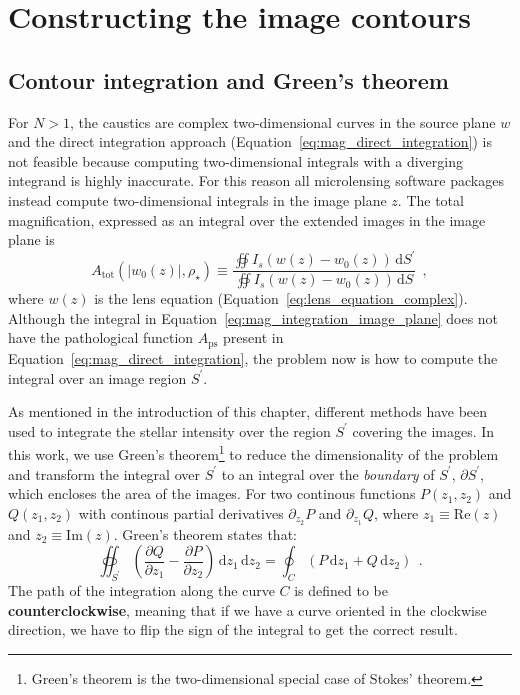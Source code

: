 \documentclass[12pt,dvipsnames]{report}
\newcommand{\ud}{\,\mathrm{d}}
\newcommand{\hquad}{~~}
\begin{document}
\section{Constructing the image contours}
\label{sec:caustics_constructing_contours}
\subsection{Contour integration and Green's theorem}
For $N>1$, the caustics are complex two-dimensional curves in the source plane
$w$ and the direct integration approach (Equation~\ref{eq:mag_direct_integration}) is not 
feasible because computing two-dimensional integrals with a diverging integrand is 
highly inaccurate. For this reason all microlensing software packages instead 
compute two-dimensional integrals in the image plane $z$. The total magnification, 
expressed as an integral over the extended images in the image plane is 
\begin{equation}
    A_\mathrm{tot}(|w_0(z)|,\rho_\star)\equiv \frac{\oiint I_s(w(z) - w_0(z))\ud S^\prime}{
        \oiint I_s(w(z) - w_0(z))\ud S}
        \hquad,
    \label{eq:mag_integration_image_plane}
\end{equation}
where $w(z)$ is the lens equation (Equation~\ref{eq:lens_equation_complex}).
Although the integral in Equation~\ref{eq:mag_integration_image_plane} does not have the
pathological function $A_\mathrm{ps}$ present in Equation~\ref{eq:mag_direct_integration},
the problem now is how to compute the integral over an image region $S^\prime$.

As mentioned in the introduction of this chapter, different methods have been used to 
integrate the stellar intensity over the region $S^\prime$ covering the images. 
In this work, we use Green's theorem\footnote{Green's theorem is the two-dimensional special case of
    Stokes' theorem.} to reduce the dimensionality of the problem and transform the
integral over $S^\prime$ to an integral over the \emph{boundary} of $S^\prime$, $\partial S^\prime$,
which encloses the area of the images.
For two continous functions $P(z_1, z_2)$ and $Q(z_1, z_2)$
with continous partial derivatives $\partial_{z_2}P$ and $\partial_{z_1}Q$, where 
$z_1\equiv\mathrm{Re}(z)$ and $z_2\equiv\mathrm{Im}(z)$. Green's theorem states that:
\begin{equation}
    \oiint_{{S}^\prime}\left(\frac{\partial Q}{\partial z_{1}}-
    \frac{\partial P}{\partial z_{2}} \right) \ud z_{1} \ud z_{2}= \oint_{C} (P \ud z_{1}+Q \ud
    z_{2})\hquad . 
    \label{eq:green_theorem}
\end{equation}
The path of the integration along the curve $C$ is defined to be
\textbf{counterclockwise}, meaning that if we have a curve oriented in the clockwise
direction, we have to flip the sign of the integral to get the correct result.
\end{document}

